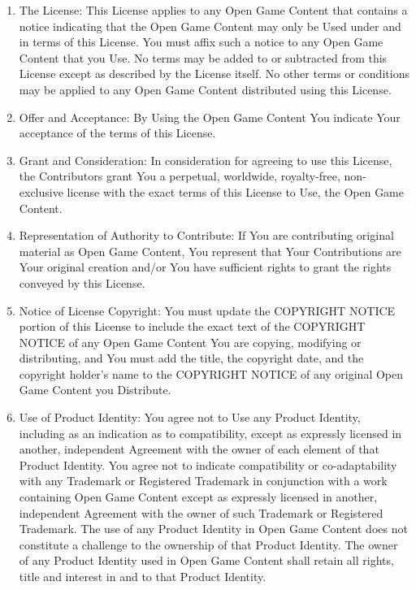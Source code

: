 \documentclass{tufte-handout}
\begin{document}
\begin{fullwidth}
\begin{enumerate}
\item The License: This License applies to any Open Game Content that
  contains a notice indicating that the Open Game Content may only be
  Used under and in terms of this License. You must affix such a
  notice to any Open Game Content that you Use. No terms may be added
  to or subtracted from this License except as described by the
  License itself. No other terms or conditions may be applied to any
  Open Game Content distributed using this License.

\item Offer and Acceptance: By Using the Open Game Content You
  indicate Your acceptance of the terms of this License.

\item Grant and Consideration: In consideration for agreeing to use
  this License, the Contributors grant You a perpetual, worldwide,
  royalty-free, non-exclusive license with the exact terms of this
  License to Use, the Open Game Content.

\item Representation of Authority to Contribute: If You are
  contributing original material as Open Game Content, You represent
  that Your Contributions are Your original creation and/or You have
  sufficient rights to grant the rights conveyed by this License.

\item Notice of License Copyright: You must update the COPYRIGHT
  NOTICE portion of this License to include the exact text of the
  COPYRIGHT NOTICE of any Open Game Content You are copying, modifying
  or distributing, and You must add the title, the copyright date,
  and the copyright holder's name to the COPYRIGHT NOTICE of any
  original Open Game Content you Distribute.

\item Use of Product Identity: You agree not to Use any Product
  Identity, including as an indication as to compatibility, except as
  expressly licensed in another, independent Agreement with the owner
  of each element of that Product Identity. You agree not to indicate
  compatibility or co-adaptability with any Trademark or Registered
  Trademark in conjunction with a work containing Open Game Content
  except as expressly licensed in another, independent Agreement with
  the owner of such Trademark or Registered Trademark. The use of any
  Product Identity in Open Game Content does not constitute a
  challenge to the ownership of that Product Identity. The owner of
  any Product Identity used in Open Game Content shall retain all
  rights, title and interest in and to that Product Identity.


\end{enumerate}
\end{fullwidth}
\end{document}
